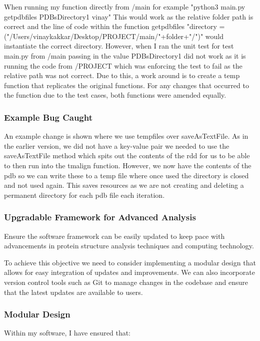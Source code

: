 \documentclass[]{final_report}
\begin{document}
When running my function directly from /main for example "python3 main.py getpdbfiles PDBsDirectory1 vinay" This would work as the relative folder path is correct and the line of code within the function getpdbfiles "directory = ("/Users/vinaykakkar/Desktop/PROJECT/main/"+folder+"/")" would instantiate the correct directory. However, when I ran the unit test for test main.py from /main passing in the value PDBsDirectory1 did not work as it is running the code from /PROJECT which was enforcing the test to fail as the relative path was not correct. Due to this, a work around is to create a temp function that replicates the original functions. For any changes that occurred to the function due to the test cases, both functions were amended equally.

\subsubsection{Example Bug Caught}

An example change is shown where we use tempfiles over saveAsTextFile. As in the earlier version, we did not have a key-value pair we needed to use the saveAsTextFile method which spits out the contents of the rdd for us to be able to then run into the tmalign function. However, we now have the contents of the pdb so we can write these to a temp file where once used the directory is closed and not used again. This saves resources as we are not creating and deleting a permanent directory for each pdb file each iteration.

\clearpage

\subsubsection{Upgradable Framework for Advanced Analysis}
\begin{displayquote}
    Ensure the software framework can be easily updated to keep pace with advancements
    in protein structure analysis techniques and computing technology.
\end{displayquote}

To achieve this objective we need to consider implementing a modular design that allows for easy integration of updates and improvements. We can also incorporate version control tools such as Git to manage changes in the codebase and ensure that the latest updates are available to users.

\subsubsection{Modular Design}
Within my software, I have ensured that:
\end{document}

